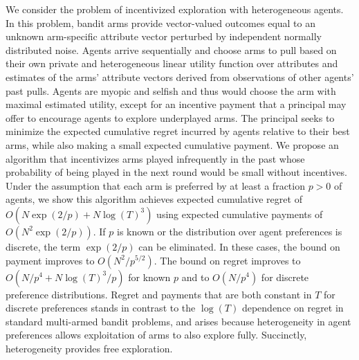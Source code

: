 We consider the problem of incentivized exploration with heterogeneous agents.
In this problem, bandit arms provide vector-valued outcomes equal to an unknown
arm-specific attribute vector perturbed by independent normally distributed
noise.  Agents arrive sequentially and choose arms to pull based on their own
private and heterogeneous linear utility function over attributes and estimates
of the arms' attribute vectors derived from observations of other agents' past
pulls.  Agents are myopic and selfish and thus would choose the arm with
maximal estimated utility, except for an incentive payment that a principal may
offer to encourage agents to explore underplayed arms.  The principal seeks to
minimize the expected cumulative regret incurred by agents relative to their
best arms, while also making a small expected cumulative payment.  We propose
an algorithm that incentivizes arms played infrequently in the
past whose probability of being played in the next round would be small
without incentives.  Under the assumption that each arm is preferred by at
least a fraction $p>0$ of agents, we show this algorithm achieves expected
cumulative regret of $O(N\exp(2/p) + N \log(T)^3)$ using expected cumulative
payments of $O(N^2 \exp(2/p))$.  If $p$ is known or the distribution over agent
preferences is discrete, the term $\exp(2/p)$ can be eliminated.  In these
cases, the bound on payment improves to $O(N^2 / p^{5/2})$.  The bound on
regret improves to $O(N/p^4 + N \log(T)^3 / p)$ for known $p$ and to
$O(N/p^4)$ for discrete preference distributions.  Regret and
payments that are both constant in $T$ for discrete preferences stands
in contrast to the $\log(T)$ dependence on regret in standard multi-armed bandit
problems, and arises because heterogeneity in agent preferences allows
exploitation of arms to also explore fully.
Succinctly, heterogeneity provides free exploration.
